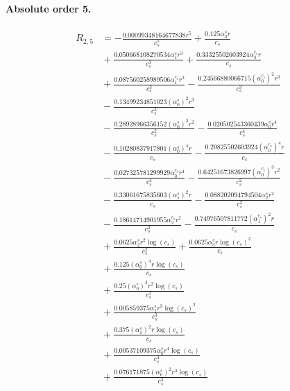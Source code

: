\documentclass[10pt]{article}
\begin{document}
\paragraph{Absolute order 5.}
\begin{align*}
R_{2,5} &=  - \frac{0.00099348164677838 r^{5}}{c_{s}^{5}} + \frac{0.125 \alpha_{3}^s r}{c_{s}} \\
&{}  + \frac{0.050668108270534 \alpha_{1}^s r^{3}}{c_{s}^{3}} + \frac{0.33325502603924 \alpha_{3}^{c_s} r}{c_{s}} \\
&{}  + \frac{0.087560258989506 \alpha_{1}^{c_s} r^{3}}{c_{s}^{3}} - \frac{0.24566880066715 \left(\alpha_{0}^{c_s}\right)^{2} r^{3}}{c_{s}^{3}} \\
&{}  - \frac{0.13499234851023 \left(\alpha_{0}^s\right)^{2} r^{3}}{c_{s}^{3}} \\
&{}  - \frac{0.28928966356152 \left(\alpha_{0}^s\right)^{3} r^{2}}{c_{s}^{2}} - \frac{0.020502543360439 \alpha_{0}^s r^{4}}{c_{s}^{4}} \\
&{}  - \frac{0.10280837917801 \left(\alpha_{0}^s\right)^{4} r}{c_{s}} - \frac{0.20825502603924 \left(\alpha_{0}^{c_s}\right)^{4} r}{c_{s}} \\
&{}  - \frac{0.027325781299929 \alpha_{0}^{c_s} r^{4}}{c_{s}^{4}} - \frac{0.64251673826997 \left(\alpha_{0}^{c_s}\right)^{3} r^{2}}{c_{s}^{2}} \\
&{}  - \frac{0.33061675835603 \left(\alpha_{1}^s\right)^{2} r}{c_{s}} - \frac{0.088202094794504 \alpha_{2}^s r^{2}}{c_{s}^{2}} \\
&{}  - \frac{0.18614714901955 \alpha_{2}^{c_s} r^{2}}{c_{s}^{2}} - \frac{0.74976507811772 \left(\alpha_{1}^{c_s}\right)^{2} r}{c_{s}} \\
&{}  + \frac{0.0625 \alpha_{2}^s r^{2} \log{\left(c_{s} \right)}}{c_{s}^{2}} + \frac{0.0625 \alpha_{3}^s r \log{\left(c_{s} \right)}^{2}}{c_{s}} \\
&{}  + \frac{0.125 \left(\alpha_{0}^s\right)^{4} r \log{\left(c_{s} \right)}}{c_{s}} \\
&{}  + \frac{0.25 \left(\alpha_{0}^s\right)^{3} r^{2} \log{\left(c_{s} \right)}}{c_{s}^{2}} \\
&{}  + \frac{0.005859375 \alpha_{1}^s r^{3} \log{\left(c_{s} \right)}^{2}}{c_{s}^{3}} \\
&{}  + \frac{0.375 \left(\alpha_{1}^s\right)^{2} r \log{\left(c_{s} \right)}}{c_{s}} \\
&{}  + \frac{0.00537109375 \alpha_{0}^s r^{4} \log{\left(c_{s} \right)}}{c_{s}^{4}} \\
&{}  + \frac{0.076171875 \left(\alpha_{0}^s\right)^{2} r^{3} \log{\left(c_{s} \right)}}{c_{s}^{3}} \\

\end{align*}
\end{document}
